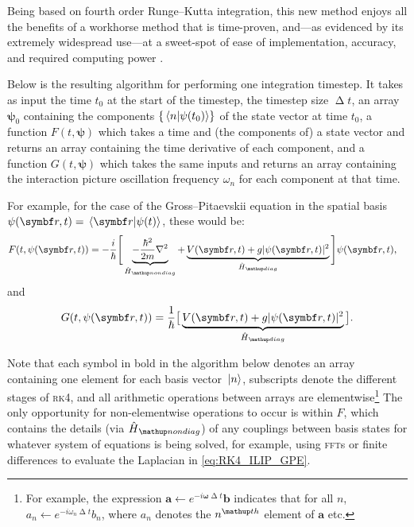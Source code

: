 Being based on fourth order Runge--Kutta integration, this new method enjoys all the benefits of a workhorse method that is time-proven, and---as evidenced by its extremely widespread use---at a sweet-spot of ease of implementation, accuracy, and required computing power \cite{artofscientificcomputing1992}.

Below is the resulting algorithm for performing one integration timestep. It takes as input the time $t_0$ at the start of the timestep, the timestep size $\upDelta t$, an array $\mathbf{\psi}_0$ containing the components $\{\braket{n}{\psi(t_0)}\}$ of the state vector at time $t_0$, a function $F(t, \mathbf{\psi})$ which takes a time and (the components of) a state vector and returns an array containing the time derivative of each component, and a function $G(t, \mathbf{\psi})$ which takes the same inputs and returns an array containing the interaction picture oscillation frequency $\omega_n$ for each component at that time.

For example, for the case of the Gross--Pitaevskii equation \cite{pethick2002bose} in the spatial basis $\psi(\vec r, t) = \braket{\vec r}{\psi(t)}$, these would be:
\begin{align}\label{eq:RK4_ILIP_GPE}
F(t, \psi(\vec r, t)) &= -\frac i \hbar\Bigg[\underbrace{-\frac{\hbar^2}{2m}\nabla^2}_{\hat H_\up{nondiag}} + \underbrace{V(\vec r, t) + g|\psi(\vec r, t)|^2}_{\hat H_\up{diag}}\Bigg]\psi(\vec r, t),
\end{align}
and
\begin{align}
G(t, \psi(\vec r, t)) = \frac1\hbar\big[\underbrace{V(\vec r, t) + g|\psi(\vec r, t)|^2}_{\hat H_\up{diag}}\big].
\end{align}

Note that each symbol in bold in the algorithm below denotes an array containing one element for each basis vector $\ket{n}$, subscripts denote the different stages of \textsc{rk4}, and all arithmetic operations between arrays are elementwise\footnote{For example, the expression \mbox{$\mathbf{a}\leftarrow e^{-i\mathbf{\omega}\upDelta t}\mathbf{b}$} indicates that for all $n$, \mbox{$a_n\leftarrow e^{-i\omega_n\upDelta t}b_n$}, where $a_n$ denotes the $n^\up{th}$ element of $\mathbf{a}$ etc.} The only opportunity for non-elementwise operations to occur is within $F$, which contains the details (via $\hat H_\up{nondiag}$) of any couplings between basis states for whatever system of equations is being solved, for example, using \textsc{fft}s or finite differences to evaluate the Laplacian in \eqref{eq:RK4_ILIP_GPE}.


